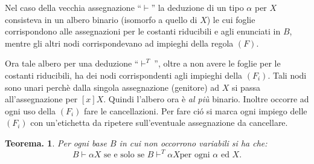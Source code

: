 \documentclass{book}
\newtheorem{teorema}{Teorema.}[chapter]
\newcommand*{\asse}{\vdash\!\!           }
\newcommand*{\asset}{\vdash^T\!\!}
\begin{document}
Nel caso della vecchia assegnazione ``$\vdash$'' la deduzione di un tipo 
$\alpha$ per $X$ consisteva in un albero binario (isomorfo a quello di $X$) le
cui foglie corrispondono alle assegnazioni per le costanti riducibili e agli
enunciati in $B$, mentre gli altri nodi corrispondevano ad impieghi della
regola $(F)$.

Ora tale albero per una deduzione ``$\asset~$'', oltre a non avere le foglie 
per le costanti riducibili, ha dei nodi corrispondenti agli impieghi della
$(F_i)$. Tali nodi sono unari perch\`e dalla singola assegnazione (genitore)
ad $X$ si passa all'assegnazione per $[x]X$.
Quindi l'albero ora \`e \emph{al pi\`u} binario. Inoltre occorre ad ogni uso 
della $(F_i)$ fare le cancellazioni. Per fare ci\'o si marca ogni impiego 
delle $(F_i)$ con un'etichetta da ripetere sull'eventuale assegnazione da 
cancellare.

\begin{teorema}
Per ogni base $B$ in cui non occorrono variabili si ha che:
\[
B \asse \alpha X \text{ se e solo se } B \asset \alpha X \text{per ogni 
$\alpha$ ed $X$.}
\]
\end{teorema}
\end{document}

